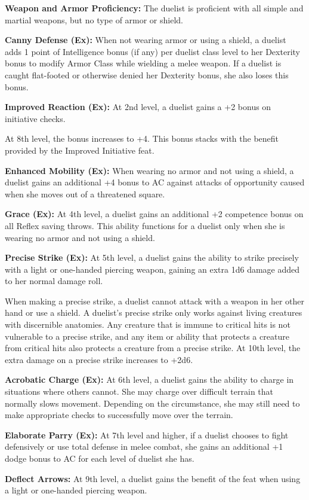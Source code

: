 {
\textbf{Weapon and Armor Proficiency:} The duelist is proficient with all simple and martial weapons, but no type of armor or shield.

\textbf{Canny Defense (Ex):} When not wearing armor or using a shield, a duelist adds 1 point of Intelligence bonus (if any) per duelist class level to her Dexterity bonus to modify Armor Class while wielding a melee weapon. If a duelist is caught flat-footed or otherwise denied her Dexterity bonus, she also loses this bonus.

\textbf{Improved Reaction (Ex):} At 2nd level, a duelist gains a +2 bonus on initiative checks.

At 8th level, the bonus increases to +4. This bonus stacks with the benefit provided by the Improved Initiative feat.

\textbf{Enhanced Mobility (Ex):} When wearing no armor and not using a shield, a duelist gains an additional +4 bonus to AC against attacks of opportunity caused when she moves out of a threatened square.

\textbf{Grace (Ex):} At 4th level, a duelist gains an additional +2 competence bonus on all Reflex saving throws. This ability functions for a duelist only when she is wearing no armor and not using a shield.

\textbf{Precise Strike (Ex):} At 5th level, a duelist gains the ability to strike precisely with a light or one-handed piercing weapon, gaining an extra 1d6 damage added to her normal damage roll.

When making a precise strike, a duelist cannot attack with a weapon in her other hand or use a shield. A duelist's precise strike only works against living creatures with discernible anatomies. Any creature that is immune to critical hits is not vulnerable to a precise strike, and any item or ability that protects a creature from critical hits also protects a creature from a precise strike. At 10th level, the extra damage on a precise strike increases to +2d6.

\textbf{Acrobatic Charge (Ex):} At 6th level, a duelist gains the ability to charge in situations where others cannot. She may charge over difficult terrain that normally slows movement. Depending on the circumstance, she may still need to make appropriate checks to successfully move over the terrain.

\textbf{Elaborate Parry (Ex):} At 7th level and higher, if a duelist chooses to fight defensively or use total defense in melee combat, she gains an additional +1 dodge bonus to AC for each level of duelist she has.

\textbf{Deflect Arrows:} At 9th level, a duelist gains the benefit of the  feat when using a light or one-handed piercing weapon.
}